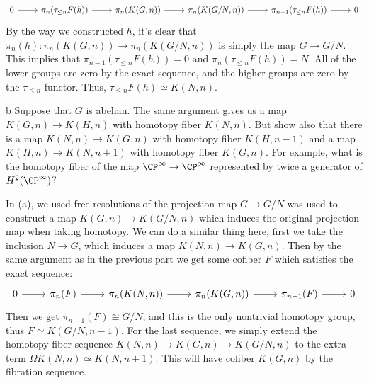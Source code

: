 \documentclass[11pt,letterpaper]{article}
\begin{document}
\begin{solution}
    \[\begin{tikzcd}
        0 & {\pi_n(\tau_{\leq n} F(h))} & {\pi_n(K(G,n))} & {\pi_n(K(G/N,n))} & {\pi_{n-1}(\tau_{\leq n} F(h))} & 0
        \arrow[from=1-4, to=1-5]
        \arrow[from=1-5, to=1-6]
        \arrow[from=1-3, to=1-4]
        \arrow[from=1-2, to=1-3]
        \arrow[from=1-1, to=1-2]
    \end{tikzcd}\]
    By the way we constructed $h$, it's clear that $\pi_n(h) : \pi_n(K(G,n)) \to \pi_n(K(G /N, n))$ is simply the map $G \to G /N$. This implies that $\pi_{n-1}(\tau_{\leq n}F(h)) =0$ and $\pi_n(\tau_{\leq n}F(h))=N$. All of the lower groups are zero by the exact sequence, and the higher groups are zero by the $\tau_{\leq n}$ functor. Thus, $\tau_{\leq n}F(h)\simeq K(N,n)$.  

    \begin{partproblem}{b}
        Suppose that $G$ is abelian. The same argument gives us a map $K(G,n) \to K(H,n)$ with homotopy fiber $K(N,n)$. But show also that there is a map $K(N, n) \to K(G, n)$ with homotopy fiber $K(H, n-1)$ and a map $K(H, n) \to K(N, n+1)$ with homotopy fiber $K(G,n)$. For example, what is the homotopy fiber of the map $\CP^\infty \to \CP^\infty$ represented by twice a generator of $H^2(\CP^\infty)$?     
    \end{partproblem}

    \quad In (a), we used free resolutions of the projection map $G \to G/N$ was used to construct a map $K(G,n) \to K(G /N, n)$ which induces the original projection map when taking homotopy. We can do a similar thing here, first we take the inclusion $N \to G$, which induces a map $K(N,n) \to K(G,n)$. Then by the same argument as in the previous part we get some cofiber $F$ which satisfies the exact sequence:
    \[\begin{tikzcd}
        0 & {\pi_n(F)} & {\pi_n(K(N,n))} & {\pi_n(K(G,n))} & {\pi_{n-1}(F)} & 0
        \arrow[from=1-4, to=1-5]
        \arrow[from=1-5, to=1-6]
        \arrow[from=1-3, to=1-4]
        \arrow[from=1-2, to=1-3]
        \arrow[from=1-1, to=1-2]
    \end{tikzcd}\]
    Then we get $\pi_{n-1}(F)\cong G / N$, and this is the only nontrivial homotopy group, thus $F\simeq K(G /N, n-1)$. For the last sequence, we simply extend the homotopy fiber sequence $K(N,n)\to K(G,n)\to K(G / N, n)$ to the extra term $\Omega K(N,n) \simeq K(N, n+1)$. This will have cofiber $K(G,n)$ by the fibration sequence.
    

\end{solution}
\end{document}
